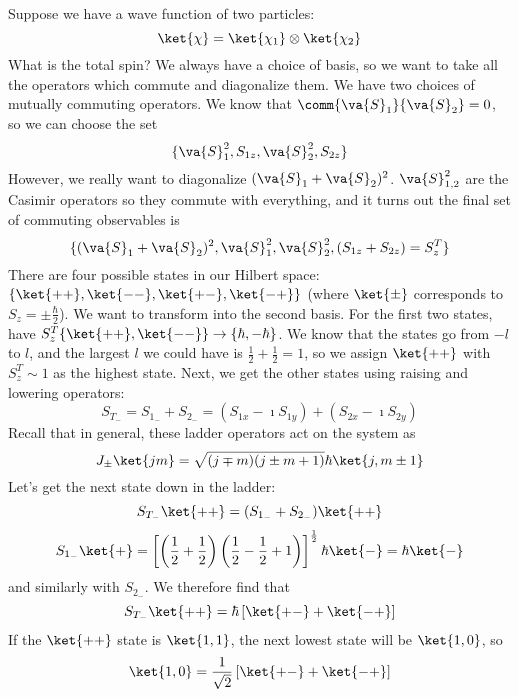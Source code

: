 \documentclass[a4paper,twoside,master.tex]{subfiles}
\begin{document}
\begin{ex}
    Suppose we have a wave function of two particles:
    \begin{equation}
        \ket{\chi} =\ket{\chi_1} \otimes\ket{\chi_2}
    \end{equation}
    What is the total spin? We always have a choice of basis, so we want to take all the operators which commute and diagonalize them. We have two choices of mutually commuting operators. We know that $ \comm{\va{S}_1}{\va{S}_2} = 0 $, so we can choose the set
    \begin{equation}
        \{\va{S}^2_1, S_{1z}, \va{S}^2_2, S_{2z}\}
    \end{equation}
    However, we really want to diagonalize $ (\va{S}_1 + \va{S}_2)^2 $. $ \va{S}^2_{1,2} $ are the Casimir operators so they commute with everything, and it turns out the final set of commuting observables is
    \begin{equation}
        \{(\va{S}_1 + \va{S}_2)^2, \va{S}^2_1, \va{S}_2^2, (S_{1z} + S_{2z}) = S_z^T\}
    \end{equation}
    There are four possible states in our Hilbert space: $ \{\ket{++},\ket{--},\ket{+-},\ket{-+}\} $ (where $\ket{\pm} $ corresponds to $ S_z = \pm\frac{\hbar}{2} $). We want to transform into the second basis. For the first two states, have $ S_z^T\{\ket{++},\ket{--} \} \to \{ \hbar, - \hbar\} $. We know that the states go from $ -l $ to $ l $, and the largest $ l $ we could have is $ \frac{1}{2} + \frac{1}{2} = 1 $, so we assign $\ket{++} $ with $ S_z^T \sim 1 $ as the highest state. Next, we get the other states using raising and lowering operators:
    \begin{equation}
        S_{T_-} = S_{1_-} + S_{2_-} = (S_{1x} - \imath S_{1y}) + (S_{2x} - \imath S_{2y})
    \end{equation}
    Recall that in general, these ladder operators act on the system as
    \begin{equation}
        J_{\pm} \ket{jm} = \sqrt{(j\mp m)(j\pm m+1)} \hbar\ket{j,m\pm 1}
    \end{equation}
    Let's get the next state down in the ladder:
    \begin{equation}
        S_{T_-}\ket{++} = (S_{1_-} + S_{2_-})\ket{++}
    \end{equation}
    \begin{equation}
        S_{1_-}\ket{+} = \left[ \left( \frac{1}{2} + \frac{1}{2} \right) \left( \frac{1}{2} - \frac{1}{2} + 1 \right) \right]^{\frac{1}{2}} \hbar \ket{-} = \hbar\ket{-}
    \end{equation}
    and similarly with $ S_{2_-} $. We therefore find that
    \begin{equation}
        S_{T_-}\ket{++} = \hbar \left[\ket{+-} +\ket{-+} \right]
    \end{equation}
    If the $\ket{++} $ state is $\ket{1,1} $, the next lowest state will be $\ket{1,0} $, so
    \begin{equation}
        \ket{1,0} = \frac{1}{\sqrt{2}} \left[\ket{+-} +\ket{-+} \right]
    \end{equation}
\end{ex}
\end{document}
